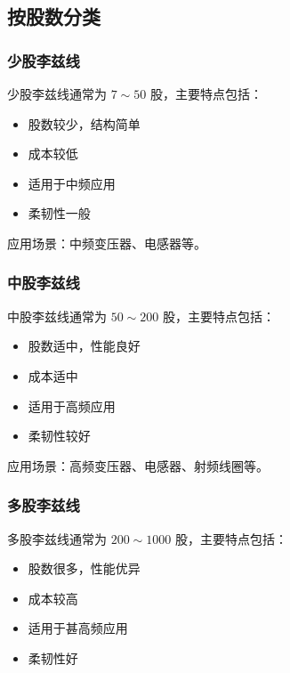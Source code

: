 \documentclass[12pt,UTF8]{ctexbook}
\begin{document}
\subsection{按股数分类}

\subsubsection{少股李兹线}

少股李兹线通常为 $7 \sim 50$ 股，主要特点包括：

\begin{itemize}[leftmargin=2cm]
    \item 股数较少，结构简单
    \item 成本较低
    \item 适用于中频应用
    \item 柔韧性一般
\end{itemize}

应用场景：中频变压器、电感器等。

\subsubsection{中股李兹线}

中股李兹线通常为 $50 \sim 200$ 股，主要特点包括：

\begin{itemize}[leftmargin=2cm]
    \item 股数适中，性能良好
    \item 成本适中
    \item 适用于高频应用
    \item 柔韧性较好
\end{itemize}

应用场景：高频变压器、电感器、射频线圈等。

\subsubsection{多股李兹线}

多股李兹线通常为 $200 \sim 1000$ 股，主要特点包括：

\begin{itemize}[leftmargin=2cm]
    \item 股数很多，性能优异
    \item 成本较高
    \item 适用于甚高频应用
    \item 柔韧性好
\end{itemize}
\end{document}
